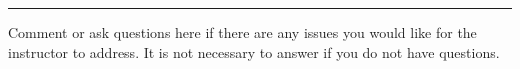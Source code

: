 \documentclass[letterpaper,12pt]{exam}
\begin{document}
\begin{questions}
\begin{samepage}
    \begin{center}
    \rule{0.8\textwidth}{.4pt}
    \end{center}
	\question Comment or ask questions here if there are any issues you would like for the instructor to address.  It is not necessary to answer if you do not have questions.
	\vspace{30mm}
\end{samepage}

\end{questions}
\end{document}
